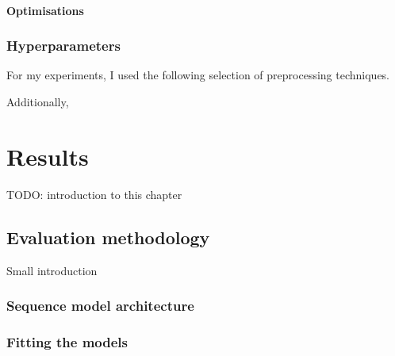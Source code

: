 \documentclass{statsmsc}
\begin{document}
\subsubsection{Optimisations}%
\label{ssub:Optimisations}



\subsection{Hyperparameters}%
\label{sub:Hyperparameters}

For my experiments, I used the following selection of preprocessing techniques.


Additionally,



\chapter{Results} %

TODO: introduction to this chapter

\section{Evaluation methodology}%
\label{sec:Evaluation methodology}%

Small introduction

\subsection{Sequence model architecture}%
\label{sub:Sequence model architecture}


\subsection{Fitting the models}%
\label{sub:Fitting the models}
\end{document}
